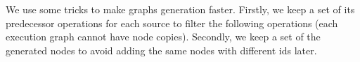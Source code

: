 We use some tricks to make graphs generation faster.
Firstly, we keep a set of its predecessor operations for each source to filter the following operations (each execution graph cannot have node copies).
Secondly, we keep a set of the generated nodes to avoid adding the same nodes with different ids later.



